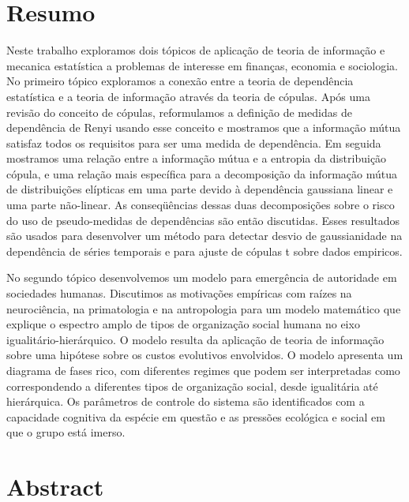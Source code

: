 \chapter*{Resumo}
Neste trabalho exploramos dois tópicos de aplicação de teoria de informação e mecanica estatística a problemas de interesse em finanças, economia e sociologia. No primeiro tópico exploramos a conexão entre a teoria de dependência estatística e a teoria de informação através da teoria de cópulas. Após uma revisão do conceito de cópulas, reformulamos a definição de medidas de dependência de Renyi\citep{Renyi1959} usando esse conceito e mostramos que a informação mútua satisfaz todos os requisitos para ser uma medida de dependência. Em seguida mostramos uma relação entre a informação mútua e a entropia da distribuição cópula, e uma relação mais específica para a decomposição da informação mútua de distribuições elípticas em uma parte devido à dependência gaussiana linear e uma parte não-linear. As conseqüências dessas duas decomposições sobre o risco do uso de pseudo-medidas de dependências são então discutidas. Esses resultados são usados para desenvolver um método para detectar desvio de gaussianidade na dependência de séries temporais e para ajuste de cópulas t sobre dados empiricos\citep{Calsaverini2009}.

No segundo tópico desenvolvemos um modelo para emergência de autoridade em sociedades humanas. Discutimos as motivações empíricas com raízes na neurociência, na primatologia e na antropologia para um modelo matemático que explique o espectro amplo de tipos de organização social humana no eixo igualitário-hierárquico. O modelo resulta da aplicação de teoria de informação sobre uma hipótese sobre os custos evolutivos envolvidos. O modelo apresenta um diagrama de fases rico, com diferentes regimes que podem ser interpretadas como correspondendo a diferentes tipos de organização social, desde igualitária até hierárquica. Os parâmetros de controle do sistema são identificados com a capacidade cognitiva da espécie em questão e as pressões ecológica e social em que o grupo está imerso.

\chapter*{Abstract}
 
